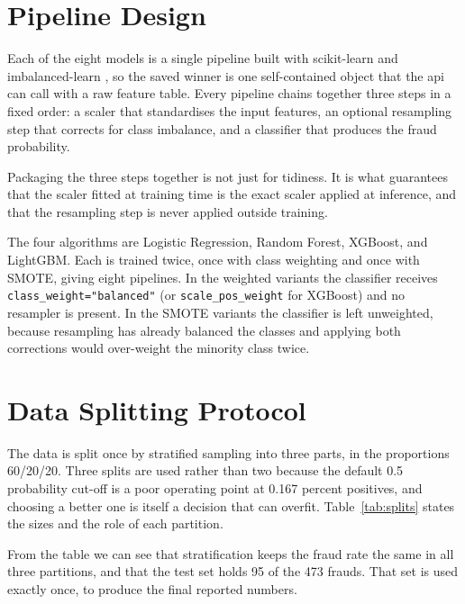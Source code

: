 \section{Pipeline Design}

Each of the eight models is a single pipeline built with scikit-learn
\citep{pedregosa2011scikit} and imbalanced-learn \citep{lemaitre2017imbalanced}, so the
saved winner is one self-contained object that the \gls{api} can call with a raw feature
table. Every pipeline chains together three steps in a fixed order: a scaler that
standardises the input features, an optional resampling step that corrects for class
imbalance, and a classifier that produces the fraud probability.

Packaging the three steps together is not just for tidiness. It is what guarantees that the
scaler fitted at training time is the exact scaler applied at inference, and that the
resampling step is never applied outside training.

The four algorithms are Logistic Regression, Random Forest, XGBoost, and LightGBM. Each is
trained twice, once with class weighting and once with SMOTE, giving eight pipelines. In
the weighted variants the classifier receives \texttt{class\_\allowbreak weight="balanced"} (or
\texttt{scale\_\allowbreak pos\_\allowbreak weight} for XGBoost) and no resampler is present. In the SMOTE variants
the classifier is left unweighted, because resampling has already balanced the classes and
applying both corrections would over-weight the minority class twice.

\section{Data Splitting Protocol}
\label{sec:splits}

The data is split once by stratified sampling into three parts, in the proportions 60/20/20.
Three splits are used rather than two because the default 0.5 probability cut-off is a poor
operating point at 0.167 percent positives, and choosing a better one is itself a decision
that can overfit. Table~\ref{tab:splits} states the sizes and the role of each partition.

\begin{table}[htbp]
    \centering
    \caption{Data splits.}
    \label{tab:splits}
    \small
    
\end{table}

From the table we can see that stratification keeps the fraud rate the same in all three
partitions, and that the test set holds 95 of the 473 frauds. That set is used exactly
once, to produce the final reported numbers.

